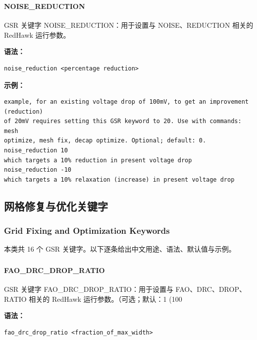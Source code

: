 \subsubsection{}
\paragraph*{NOISE_REDUCTION}

GSR 关键字 NOISE_REDUCTION：用于设置与 NOISE、REDUCTION 相关的 RedHawk 运行参数。

\textbf{语法：}
\begin{lstlisting}
noise_reduction <percentage reduction>
\end{lstlisting}

\textbf{示例：}
\begin{lstlisting}
example, for an existing voltage drop of 100mV, to get an improvement (reduction)
of 20mV requires setting this GSR keyword to 20. Use with commands: mesh
optimize, mesh fix, decap optimize. Optional; default: 0.
noise_reduction 10
which targets a 10% reduction in present voltage drop
noise_reduction -10
which targets a 10% relaxation (increase) in present voltage drop
\end{lstlisting}

\subsection{网格修复与优化关键字}
\subsubsection*{Grid Fixing and Optimization Keywords}

本类共 16 个 GSR 关键字。以下逐条给出中文用途、语法、默认值与示例。

\subsubsection{}
\paragraph*{FAO_DRC_DROP_RATIO}

GSR 关键字 FAO_DRC_DROP_RATIO：用于设置与 FAO、DRC、DROP、RATIO 相关的 RedHawk 运行参数。（可选；默认：1 (100%

\textbf{语法：}
\begin{lstlisting}
fao_drc_drop_ratio <fraction_of_max_width>
\end{lstlisting}

